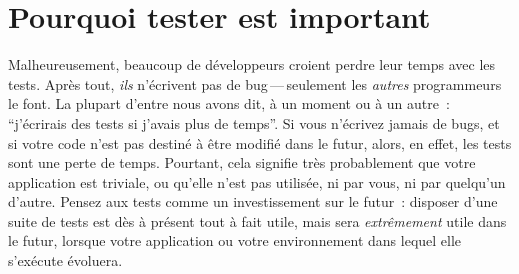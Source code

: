 \documentclass[a4paper,10pt,twoside]{book}
\begin{document}

\section{Pourquoi tester est important}

Malheureusement, beaucoup de développeurs croient perdre leur temps avec les tests. 
Après tout, \emph{ils} n'écrivent pas de bug\,---\,seulement les \emph{autres} programmeurs le font. La plupart d'entre nous avons dit, à un moment ou à un autre~: ``j'écrirais des tests si j'avais plus de temps''.
Si vous n'écrivez jamais de bugs, et si votre code n'est pas destiné à être modifié dans le futur, alors, en effet, les tests sont une perte de temps. Pourtant, cela signifie très probablement que votre application est triviale, ou qu'elle n'est pas utilisée, ni par vous, ni par quelqu'un d'autre. Pensez aux tests comme un investissement sur le futur~: disposer d'une suite de tests est dès à présent tout à fait utile, mais sera \emph{extrêmement} utile dans le futur, lorsque votre application ou votre environnement dans lequel elle s'exécute évoluera. 

\end{document}
